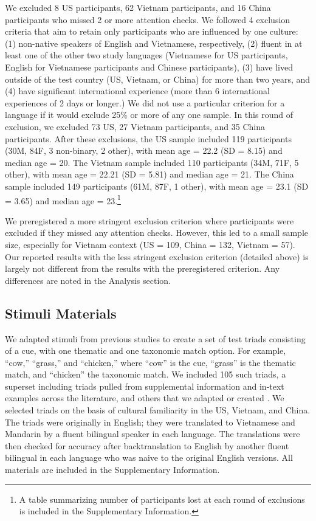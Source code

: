 \documentclass[10pt, letterpaper]{article}
\begin{document}
We excluded 8 US participants, 62 Vietnam participants, and 16 China
participants who missed 2 or more attention checks. We followed 4
exclusion criteria that aim to retain only participants who are
influenced by one culture: (1) non-native speakers of English and
Vietnamese, respectively, (2) fluent in at least one of the other two
study languages (Vietnamese for US participants, English for Vietnamese
participants and Chinese participants), (3) have lived outside of the
test country (US, Vietnam, or China) for more than two years, and (4)
have significant international experience (more than 6 international
experiences of 2 days or longer.) We did not use a particular criterion
for a language if it would exclude 25\% or more of any one sample. In
this round of exclusion, we excluded 73 US, 27 Vietnam participants, and
35 China participants. After these exclusions, the US sample included
119 participants (30M, 84F, 3 non-binary, 2 other), with mean age = 22.2
(SD = 8.15) and median age = 20. The Vietnam sample included 110
participants (34M, 71F, 5 other), with mean age = 22.21 (SD = 5.81) and
median age = 21. The China sample included 149 participants (61M, 87F, 1
other), with mean age = 23.1 (SD = 3.65) and median age = 23.\footnote{A
  table summarizing number of participants lost at each round of
  exclusions is included in the Supplementary Information.}

We preregistered a more stringent exclusion criterion where participants
were excluded if they missed any attention checks. However, this led to
a small sample size, especially for Vietnam context (US = 109, China =
132, Vietnam = 57). Our reported results with the less stringent
exclusion criterion (detailed above) is largely not different from the
results with the preregistered criterion. Any differences are noted in
the Analysis section.

\hypertarget{stimuli-materials}{%
\subsection{Stimuli Materials}\label{stimuli-materials}}

We adapted stimuli from previous studies to create a set of test triads
consisting of a cue, with one thematic and one taxonomic match option.
For example, ``cow,'' ``grass,'' and ``chicken,'' where ``cow'' is the
cue, ``grass'' is the thematic match, and ``chicken'' the taxonomic
match. We included 105 such triads, a superset including triads pulled
from supplemental information and in-text examples across the
literature, and others that we adapted or created . We selected triads
on the basis of cultural familiarity in the US, Vietnam, and China. The
triads were originally in English; they were translated to Vietnamese
and Mandarin by a fluent bilingual speaker in each language. The
translations were then checked for accuracy after backtranslation to
English by another fluent bilingual in each language who was naive to
the original English versions. All materials are included in the
Supplementary Information.
\end{document}
